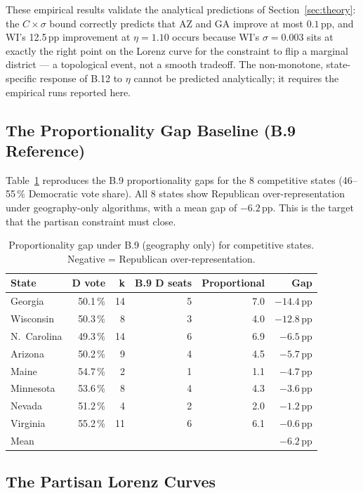 These empirical results validate the analytical predictions of Section~\ref{sec:theory}:
the $C \times \sigma$ bound correctly predicts that AZ and GA improve at most
$0.1$\,pp, and WI's 12.5\,pp improvement at $\eta = 1.10$ occurs because WI's
$\sigma = 0.003$ sits at exactly the right point on the Lorenz curve for the
constraint to flip a marginal district --- a topological event, not a smooth
tradeoff. The non-monotone, state-specific response of B.12 to $\eta$ cannot
be predicted analytically; it requires the empirical runs reported here.

\subsection{The Proportionality Gap Baseline (B.9 Reference)}

Table~\ref{tab:gap-baseline} reproduces the B.9 proportionality gaps for
the 8 competitive states (46--55\,\% Democratic vote share).
All 8 states show Republican over-representation under geography-only algorithms,
with a mean gap of $-6.2$\,pp.
This is the target that the partisan constraint must close.

\begin{table}[h]
\centering
\caption{Proportionality gap under B.9 (geography only) for competitive states.
Negative = Republican over-representation.}
\label{tab:gap-baseline}
\begin{tabular}{lrrrrr}
\toprule
State & D vote & k & B.9 D seats & Proportional & Gap \\
\midrule
Georgia   & 50.1\,\% & 14 & 5 & 7.0 & $-14.4$\,pp \\
Wisconsin & 50.3\,\% &  8 & 3 & 4.0 & $-12.8$\,pp \\
N.\ Carolina & 49.3\,\% & 14 & 6 & 6.9 & $-6.5$\,pp \\
Arizona   & 50.2\,\% &  9 & 4 & 4.5 & $-5.7$\,pp \\
Maine     & 54.7\,\% &  2 & 1 & 1.1 & $-4.7$\,pp \\
Minnesota & 53.6\,\% &  8 & 4 & 4.3 & $-3.6$\,pp \\
Nevada    & 51.2\,\% &  4 & 2 & 2.0 & $-1.2$\,pp \\
Virginia  & 55.2\,\% & 11 & 6 & 6.1 & $-0.6$\,pp \\
\midrule
Mean      &          &   &   &     & $-6.2$\,pp \\
\bottomrule
\end{tabular}
\end{table}

\subsection{The Partisan Lorenz Curves}

